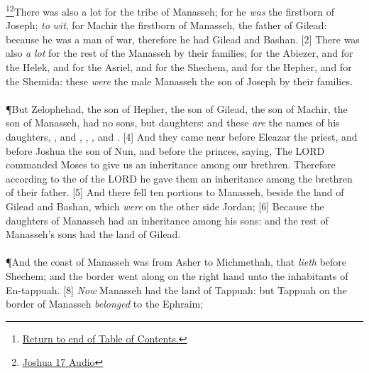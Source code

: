 \footnote{\textcolor[cmyk]{0.99998,1,0,0}{\hyperlink{TOC}{Return to end of Table of Contents.}}}\footnote{\href{https://audiobible.com/bible/joshua_17.html}{\textcolor[cmyk]{0.99998,1,0,0}{Joshua 17 Audio}}}\textcolor[cmyk]{0.99998,1,0,0}{There was also a lot for the tribe of Manasseh; for he \emph{was} the firstborn of Joseph; \emph{to} \emph{wit}, for Machir the firstborn of Manasseh, the father of Gilead: because he was a man of war, therefore he had Gilead and Bashan.}
[2] \textcolor[cmyk]{0.99998,1,0,0}{There was also \emph{a} \emph{lot} for the rest of the  Manasseh by their families; for the  Abiezer, and for the  Helek, and for the  Asriel, and for the  Shechem, and for the  Hepher, and for the  Shemida: these \emph{were} the male  Manasseh the son of Joseph by their families.}\\
\\
\P \textcolor[cmyk]{0.99998,1,0,0}{But Zelophehad, the son of Hepher, the son of Gilead, the son of Machir, the son of Manasseh, had no sons, but daughters: and these \emph{are} the names of his daughters, , and , , , and .}
[4] \textcolor[cmyk]{0.99998,1,0,0}{And they came near before Eleazar the priest, and before Joshua the son of Nun, and before the princes, saying, The LORD commanded Moses to give us an inheritance among our brethren. Therefore according to the  of the LORD he gave them an inheritance among the brethren of their father.}
[5] \textcolor[cmyk]{0.99998,1,0,0}{And there fell ten portions to Manasseh, beside the land of Gilead and Bashan, which \emph{were} on the other side Jordan;}
[6] \textcolor[cmyk]{0.99998,1,0,0}{Because the daughters of Manasseh had an inheritance among his sons: and the rest of Manasseh's sons had the land of Gilead.}\\
\\
\P \textcolor[cmyk]{0.99998,1,0,0}{And the coast of Manasseh was from Asher to Michmethah, that \emph{lieth} before Shechem; and the border went along on the right hand unto the inhabitants of En-tappuah.}
[8] \textcolor[cmyk]{0.99998,1,0,0}{\emph{Now} Manasseh had the land of Tappuah: but Tappuah on the border of Manasseh \emph{belonged} to the  Ephraim;}
